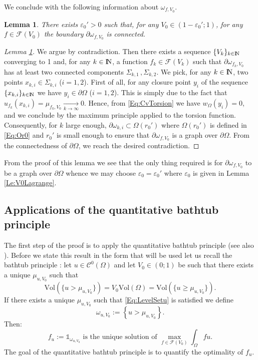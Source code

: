 \documentclass{article}
\newcommand{\N}{\textnormal{I\kern-0.21emN}}
\renewcommand{\geq}{\geqslant}
\def\e{{\varepsilon}}
\newtheorem{lemma}[material]{Lemma}
\def\O{{\Omega}}
\numberwithin{equation}{section}
\begin{document}
We conclude with the following information about $\omega_{f,V_0}$.
\begin{lemma}\label{Le:OmegaConnectedDirichlet}
There exists $\e_0'>0$ such that, for any $V_0\in (1-\e_0';1)$, for any $f\in \mathcal F(V_0)$ the boundary $\partial \omega_{f,V_0}$ is connected.
\end{lemma}
\begin{proof}[Lemma \ref{Le:OmegaConnectedDirichlet}]
We argue by contradiction. Then there exists a sequence $\{V_k\}_{k\in \N}$ converging to 1 and, for any $k\in \N$, a function $f_k\in \mathcal F(V_k)$ such that $\partial \omega_{f_k,V_0}$ has at least two connected components $\Sigma_{k,1}\,, \Sigma_{k,2}$. We pick, for any $k\in \N$, two points $x_{k,i}\in \Sigma_{k,i}$ ($i=1,2$). First of all, for any closure point $y_i$ of the sequence $\{x_{k,i}\}_{k\in \N}$ we have $y_i\in \partial \O$ ($i=1,2$). This is simply due to the fact that $u_{f_k}(x_{k,i})=\mu_{f_k,V_0}\underset{k\to \infty}\rightarrow 0$. Hence, from \eqref{Eq:CvTorsion} we have $w_\Omega(y_i)=0$, and we conclude by the maximum principle applied to the torsion function. Consequently, for $k$ large enough, $\partial \omega_{k,i}\subset \O(r_0')$ where $\O(r_0')$ is defined in \eqref{Eq:Or0} and $r_0'$ is small enough to ensure that $\partial \omega_{f,V_0}$ is a graph over $\partial \O$. From the connectedness of $\partial \O$, we reach the desired contradiction.
\end{proof}
From the proof of this lemma we see that the only thing required is for $\partial \omega_{f,V_0}$ to be a graph over $\partial \O$ whence we may choose $\e_0=\e_0'$ where $\e_0$ is given in Lemma \ref{Le:V0Lagrange}.

\subsection{Applications of the quantitative bathtub principle}
The first step of the proof is to apply the quantitative bathtub principle \cite[Proposition 26]{MRB2020} (see also {\cite{Cianchi2008}}). Before we state this result in the form that will be used let us recall the bathtub principle \cite[Theorem 1.14]{LiebLoss}:  let $u\in \mathscr C^0(\O)$ and let $V_0\in (0;1)$ be such that there exists a unique $\mu_{u,V_0}$ such that 
\begin{equation}\label{Eq:LevelSetu}\mathrm{Vol}(\{u>\mu_{u,V_0}\})=V_0\mathrm{Vol}(\O)=\mathrm{Vol}(\{u\geq \mu_{u,V_0}\}).\end{equation} If there exists a unique $\mu_{u,V_0}$ such that \eqref{Eq:LevelSetu} is satisfied we define 
\begin{equation}\label{Eq:omegau}
\omega_{u,V_0}:=\left\{u>\mu_{u,V_0}\right\}.
\end{equation}
Then:
\begin{equation}\label{Eq:Bathtub}
f_u:=\mathds 1_{\omega_{u,V_0}}\text{ is the unique solution of }\max_{f \in \mathcal F(V_0)}\int_\O f u.\end{equation}
The goal of the quantitative bathtub principle is to quantify the optimality of $f_u$.
\end{document}
